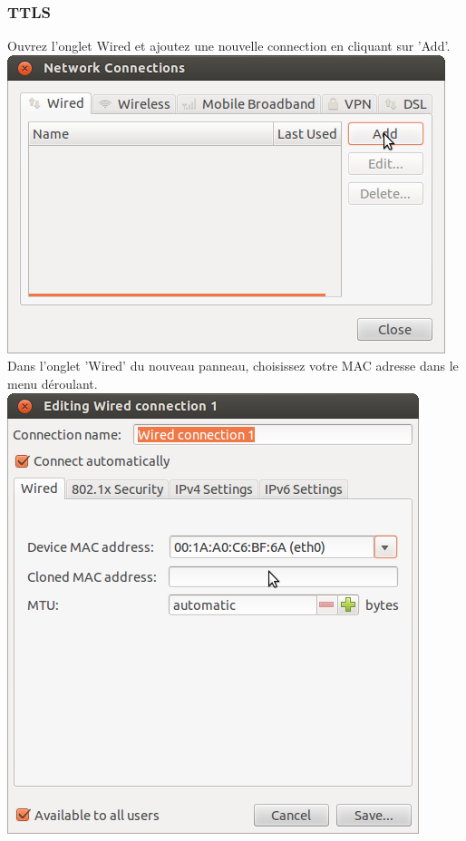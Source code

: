 \subsubsection{TTLS}
Ouvrez l'onglet Wired et ajoutez une nouvelle connection en cliquant sur 'Add'.\\
\includegraphics[width=\screenShotSize{}]{img/wiredAdd.png}\\
Dans l'onglet 'Wired' du nouveau panneau, choisissez votre MAC adresse dans le menu déroulant.\\
\includegraphics[width=\screenShotSize{}]{img/setMac.png}\\
